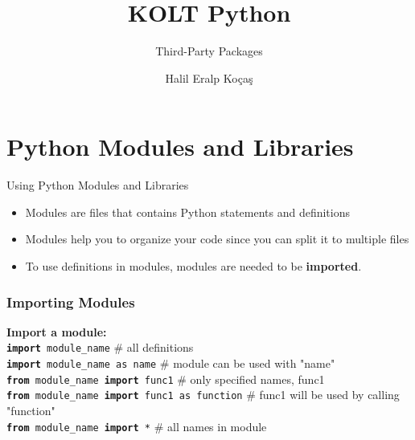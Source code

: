 
\usepackage{../KU-Beamer-Template/style/koc} 
\usepackage{minted}
\usepackage{upquote}
\usepackage{graphicx}

\title{KOLT Python}
\subtitle{Third-Party Packages} 
\date{}
\author{Halil Eralp Koçaş}




    \maketitle


    \section{Python Modules and Libraries}
    \begin{frame}{Using Python Modules and Libraries}
        \LARGE
        \begin{itemize}
            \item Modules are files that contains Python statements and definitions
            \pause
            \item Modules help you to organize your code since you can split it to multiple files
            \pause
            \item To use definitions in modules, modules are needed to be \textbf{imported}.
        \end{itemize}
    \end{frame}
     
    \begin{frame}
        \frametitle{Importing Modules}
        \LARGE
        \pause
        \textbf{Import a module:}\\
        \pause
        \texttt{\textbf{import} module\_name}  \# all definitions \\
        \pause
        \texttt{\textbf{import} module\_name as name}  \# module can be used with "name" \\
         \pause
        \texttt{\textbf{from} module\_name \textbf{import} func1}  \# only specified names, func1 \\
        \pause
        \texttt{\textbf{from} module\_name \textbf{import} func1 as function}  \# func1 will be used by calling "function" \\
        \pause
        \texttt{\textbf{from} module\_name \textbf{import} *}  \# all names in module \\
    \end{frame}

